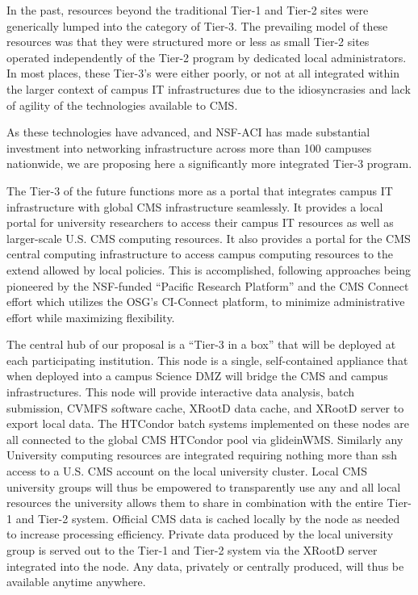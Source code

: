 \documentclass[11pt,a4paper]{article}
\begin{document}
In the past, resources beyond the traditional Tier-1 and Tier-2 sites were
generically lumped into the category of Tier-3.  The prevailing model of
these resources was that they were structured more or less as small Tier-2
sites operated independently of the Tier-2 program by dedicated local
administrators.  In most places, these Tier-3's were either poorly, or not at all integrated
within the larger context of campus IT infrastructures due to the idiosyncrasies and lack of
agility of the technologies available to CMS.

As these technologies have advanced, and NSF-ACI has made substantial
investment into networking infrastructure across more than 100 campuses nationwide,
we are proposing here a significantly more integrated Tier-3 program.

The Tier-3 of the future functions more as
a portal that integrates campus IT infrastructure with global CMS infrastructure seamlessly.  
It provides a local portal for university researchers to access their campus IT resources as well as 
larger-scale U.S. CMS computing resources.  It also provides a portal for the
CMS central computing infrastructure to access campus computing resources to the extend allowed by local policies.
This is accomplished, following approaches being pioneered by the 
NSF-funded ``Pacific
Research Platform'' and the CMS Connect effort which utilizes the OSG's
CI-Connect platform, to minimize administrative effort while
maximizing flexibility. 

The central hub of our proposal is a ``Tier-3 in a box''  that will be deployed at
each participating institution.  This node is a single, self-contained appliance that when deployed into a
campus Science DMZ will bridge the CMS and campus infrastructures.
This node will provide interactive data analysis, batch submission, CVMFS
software cache, XRootD data cache, and XRootD server to export local
data.  The HTCondor batch systems implemented on these nodes are all
connected to the global CMS HTCondor pool via glideinWMS.  Similarly any
University computing resources are integrated requiring nothing more than
ssh access to a U.S. CMS account on the local university cluster.  Local CMS
university groups will thus be empowered to transparently use any and all
local resources the university allows them to share in combination with the
entire Tier-1 and Tier-2 system. Official CMS data is cached locally by the
node as needed to increase processing efficiency.  Private data produced by the local university group is
served out to the Tier-1 and Tier-2 system via the XRootD server integrated
into the node.  Any data, privately or centrally produced, will thus be available anytime anywhere.
\end{document}
